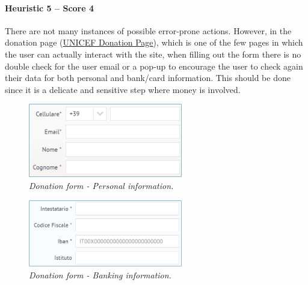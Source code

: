 \newpage

\paragraph*{Heuristic 5 – Score 4}
There are not many instances of possible error-prone actions.
However, in the donation page (\href{https://donazioni.unicef.it/}{UNICEF Donation Page}), which is one of the few pages in which the user can actually interact with the site, when filling out the form there is no double check for the user email or a pop-up to encourage the user to check again their data for both personal and bank/card information. This should be done since it is a delicate and sensitive step where money is involved.
\begin{figure}[h]
	\centering
	\begin{center}
		\includegraphics[width=0.6\textwidth]{Picture8.png}
	\end{center}
	\captionsetup{font=small}
	\caption{\textit{Donation form - Personal information.}}
	\label{fig:label8}
\end{figure}
\begin{figure}[h]
	\centering
	\begin{center}
		\includegraphics[width=0.6\textwidth]{Picture9.png}
	\end{center}
	\captionsetup{font=small}
	\caption{\textit{Donation form - Banking information.}}
	\label{fig:label9}
\end{figure}

\newpage

